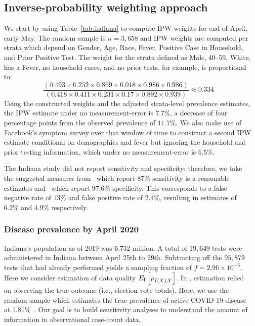 \documentclass[11pt]{amsart}
\numberwithin{equation}{section}
\theoremstyle{plain}
\def\I{\bf I}
\begin{document}
 \subsection{Inverse-probability weighting approach}
 \label{section:ipwapproach}



 We start by using Table~\ref{tab:indiana} to compute IPW weights for end of April, early May.  The random sample is $n=3,658$ and IPW weights are computed per strata which depend on Gender, Age, Race, Fever, Positive Case in Household, and Prior Positive Test.  The weight for the strata defined as Male, 40--59, White, has a Fever, no household cases, and no prior tests, for example, is proportional to:
 $$
 \frac{\left( 0.493 \times 0.252 \times 0.869 \times 0.018 \times 0.986 \times 0.986 \right)}{\left(0.418 \times 0.411 \times 0.231 \times 0.17 \times 0.892 \times 0.939 \right)} \approx 0.334
 $$
 Using the constructed weights and the adjusted strata-level prevalence estimates, the IPW estimate under no measurement-error is $7.7\%$, a decrease of four percentage points from the observed prevalence of $11.7\%$. We also make use of Facebook's symptom survey over that window of time to construct a second IPW estimate conditional on demographics and fever but ignoring the household and prior testing information, which under no measurement-error is $6.5$\%.

 The Indiana study did not report sensitivity and specificity; therefore, we take the suggested measures from~\cite{Arevalo2020} which report 87\% sensitivity is a reasonable estimates and~\cite{Cohen2020} which report 97.6\% specificity.  This corresponds to a false negative rate of $13$\% and false positive rate of $2.4\%$, resulting in estimates of $6.2\%$ and $4.9\%$ respectively.

 \subsubsection{Disease prevalence by April 2020}

 Indiana's population as of 2019 was $6.732$ million.  A total of $19,649$ tests were administered in Indiana between April 25th to 29th. Subtracting off the $95,879$ tests that had already performed yields a sampling fraction of $f = 2.96 \times 10^{-3}$.  Here we consider estimation of data quality $E_{\I} \left[ \rho_{\tilde I(X),Y} \right]$. In \cite{Meng2018}, estimation relied on observing the true outcome (i.e., election vote totals). Here, we use the random sample which estimates the true prevalence of active COVID-19 disease at 1.81\%~\cite{Yiannoutsos2021}.  Our goal is to build sensitivity analyses to understand the amount of information in observational case-count data.
\end{document}
